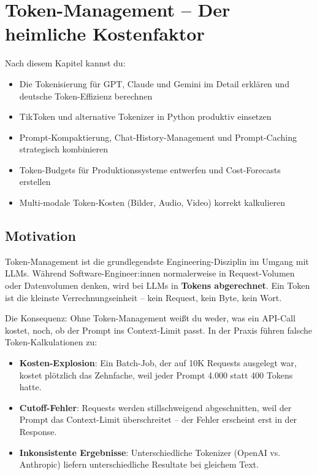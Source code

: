 \chapter{Token-Management -- Der heimliche Kostenfaktor}
\label{chap:token_management}

\begin{lernziele}
Nach diesem Kapitel kannst du:
\begin{itemize}
    \item Die Tokenisierung für GPT, Claude und Gemini im Detail erklären und deutsche Token-Effizienz berechnen
    \item TikToken und alternative Tokenizer in Python produktiv einsetzen
    \item Prompt-Kompaktierung, Chat-History-Management und Prompt-Caching strategisch kombinieren
    \item Token-Budgets für Produktionssysteme entwerfen und Cost-Forecasts erstellen
    \item Multi-modale Token-Kosten (Bilder, Audio, Video) korrekt kalkulieren
\end{itemize}
\end{lernziele}

\section{Motivation}

Token-Management ist die grundlegendste Engineering-Disziplin im Umgang mit LLMs. Während Software-Engineer:innen normalerweise in Request-Volumen oder Datenvolumen denken, wird bei LLMs in \textbf{Tokens abgerechnet}. Ein Token ist die kleinste Verrechnungseinheit -- kein Request, kein Byte, kein Wort.

Die Konsequenz: Ohne Token-Management weißt du weder, was ein API-Call kostet, noch, ob der Prompt ins Context-Limit passt. In der Praxis führen falsche Token-Kalkulationen zu:
\begin{itemize}[leftmargin=*]
    \item \textbf{Kosten-Explosion}: Ein Batch-Job, der auf 10K Requests ausgelegt war, kostet plötzlich das Zehnfache, weil jeder Prompt 4.000 statt 400 Tokens hatte.
    \item \textbf{Cutoff-Fehler}: Requests werden stillschweigend abgeschnitten, weil der Prompt das Context-Limit überschreitet -- der Fehler erscheint erst in der Response.
    \item \textbf{Inkonsistente Ergebnisse}: Unterschiedliche Tokenizer (OpenAI vs. Anthropic) liefern unterschiedliche Resultate bei gleichem Text.
\end{itemize}


